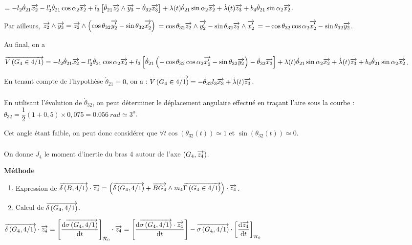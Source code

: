 \documentclass[10pt,fleqn]{article} %
\begin{document}
$= 
-l_2 \dot{\theta}_{21}\overrightarrow{x_2} 
-l_2'\dot{\theta}_{21}\cos \alpha_2\overrightarrow{x_2}+
l_3\left[ \dot{\theta}_{21}\overrightarrow{z_2}\wedge \overrightarrow{y_3}-\dot{\theta}_{32}\overrightarrow{x_3}  \right]+
\lambda(t) \dot{\theta}_{21}\sin \alpha_2\overrightarrow{x_2} +
\dot{\lambda}(t)\overrightarrow{z_3}+ b_4\dot{\theta}_{21}\sin \alpha_2\overrightarrow{x_2}$. 


Par ailleurs, 
$\overrightarrow{z_2}\wedge \overrightarrow{y_3}=\overrightarrow{z_2}\wedge \left( \cos \theta_{32} \overrightarrow{y_2'} -\sin \theta_{32} \overrightarrow{x_2'}  \right)$
$= \cos \theta_{32} \overrightarrow{z_2}\wedge  \overrightarrow{y_2'} -\sin \theta_{32} \overrightarrow{z_2}\wedge\overrightarrow{x_2'}  $
$= -\cos \theta_{32} \cos \alpha_2 \overrightarrow{x_2'} -\sin \theta_{32} \overrightarrow{y_2}  $.

Au final, on a 

$\overrightarrow{V\left( {G_4} \in {4}/{1}\right)}=
-l_2 \dot{\theta}_{21}\overrightarrow{x_2} 
-l_2'\dot{\theta}_{21}\cos \alpha_2\overrightarrow{x_2}+
l_3\left[ \dot{\theta}_{21}\left(-\cos \theta_{32} \cos \alpha_2 \overrightarrow{x_2'} -\sin \theta_{32} \overrightarrow{y_2}  \right)-\dot{\theta}_{32}\overrightarrow{x_3}  \right]+
\lambda(t) \dot{\theta}_{21}\sin \alpha_2\overrightarrow{x_2} +
\dot{\lambda}(t)\overrightarrow{z_3}+ b_4\dot{\theta}_{21}\sin \alpha_2\overrightarrow{x_2}$.


En tenant compte de l'hypothèse $\dot{\theta}_{21}=0$, on a : $\overrightarrow{V\left( {G_4} \in {4}/{1}\right)}=
-\dot{\theta}_{32}l_3\overrightarrow{x_3}  + \dot{\lambda}(t)\overrightarrow{z_3}$.


\subparagraph{}%
En utilisant l'évolution de $\dot{\theta}_{32}$, on peut déterminer le déplacement angulaire effectué en traçant l'aire sous la courbe :
$\theta_{32}=\dfrac{1}{2}\left( 1+0,5\right)\times 0,075 =\SI{0,056}{rad}\simeq 3^{\text{o}}$.

Cet angle étant faible, on peut donc considérer que $\forall t \cos \left(\theta_{32}(t)\right)\simeq 1$ et $\sin\left(\theta_{32}(t)\right)\simeq 0$.

\subparagraph{}%

On donne $J_4$ le moment d'inertie du bras 4 autour de l'axe $\left(G_4,\overrightarrow{z_4}\right)$.

\textbf{Méthode}
\begin{enumerate}
\item Expression de $\overrightarrow{\delta \left( {B}, {4} /{1}\right)}\cdot\overrightarrow{z_4} = \left( \overrightarrow{\delta \left( {G_4}, {4} /{1}\right)} + \overrightarrow{BG_4}\wedge m_4 \overrightarrow{\Gamma \left( {G_4} \in {4}/{1}\right)}\right)\cdot\overrightarrow{z_4}$.
\item Calcul de $\overrightarrow{\delta \left( {G_4}, {4} /{1}\right)}$.
\end{enumerate}

$\overrightarrow{\delta \left( {G_4}, {4} /{1}\right)} \cdot\overrightarrow{z_4} = \left[ \dfrac{\text{d} \overrightarrow{\sigma \left( {G_4}, {4} /{1}\right)}}{\text{d} t} \right]_{\mathcal{R}_{0}}\cdot\overrightarrow{z_4}
=\left[ \dfrac{\text{d} \overrightarrow{\sigma \left( {G_4}, {4} /{1}\right)}\cdot \overrightarrow{z_4}}{\text{d} t} \right]-\overrightarrow{\sigma \left( {G_4}, {4} /{1}\right)}\cdot\left[ \dfrac{\text{d} \overrightarrow{z_4}}{\text{d} t} \right]_{\mathcal{R}_{0}}$
\end{document}
